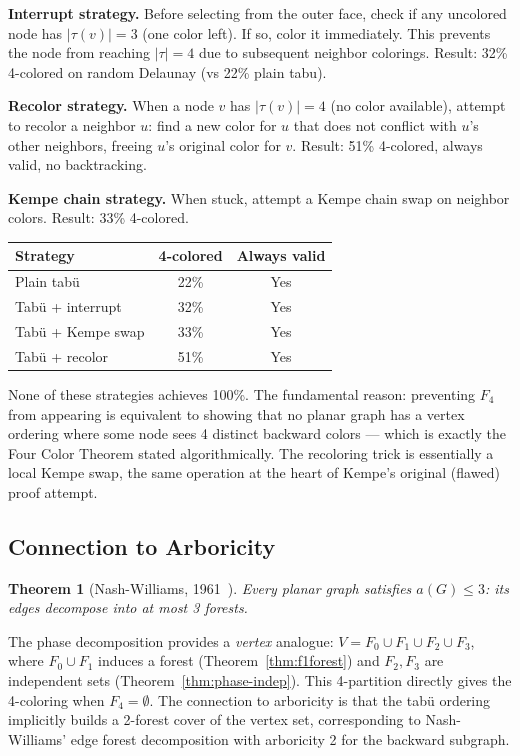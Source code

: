 \documentclass[12pt,letterpaper]{article}
\theoremstyle{plain}
\newtheorem{theorem}{Theorem}[section]
\theoremstyle{definition}
\theoremstyle{remark}
\begin{document}
\textbf{Interrupt strategy.} Before selecting from the outer face, check if any
uncolored node has $|\tau(v)| = 3$ (one color left). If so, color it immediately.
This prevents the node from reaching $|\tau| = 4$ due to subsequent neighbor
colorings. Result: 32\% 4-colored on random Delaunay (vs 22\% plain tabu).

\textbf{Recolor strategy.} When a node $v$ has $|\tau(v)| = 4$ (no color
available), attempt to recolor a neighbor $u$: find a new color for $u$ that
does not conflict with $u$'s other neighbors, freeing $u$'s original color for
$v$. Result: 51\% 4-colored, always valid, no backtracking.

\textbf{Kempe chain strategy.} When stuck, attempt a Kempe chain swap on
neighbor colors. Result: 33\% 4-colored.

\begin{center}
\begin{tabular}{lcc}
\toprule
\textbf{Strategy} & \textbf{4-colored} & \textbf{Always valid} \\
\midrule
Plain tab\"{u}             & 22\% & Yes \\
Tab\"{u} + interrupt       & 32\% & Yes \\
Tab\"{u} + Kempe swap      & 33\% & Yes \\
Tab\"{u} + recolor         & 51\% & Yes \\
\bottomrule
\end{tabular}
\end{center}

None of these strategies achieves 100\%. The fundamental reason: preventing
$F_4$ from appearing is equivalent to showing that no planar graph has a vertex
ordering where some node sees 4 distinct backward colors — which is exactly the
Four Color Theorem stated algorithmically. The recoloring trick is essentially
a local Kempe swap, the same operation at the heart of Kempe's original (flawed)
proof attempt.

\subsection{Connection to Arboricity}

\begin{theorem}[Nash-Williams, 1961~\cite{nashwilliams1961}]
Every planar graph satisfies $a(G) \leq 3$: its edges decompose into at most 3
forests.
\end{theorem}

The phase decomposition provides a \emph{vertex} analogue: $V = F_0 \cup F_1
\cup F_2 \cup F_3$, where $F_0 \cup F_1$ induces a forest (Theorem~\ref{thm:f1forest})
and $F_2, F_3$ are independent sets (Theorem~\ref{thm:phase-indep}). This
4-partition directly gives the 4-coloring when $F_4 = \emptyset$. The
connection to arboricity is that the tab\"{u} ordering implicitly builds a
2-forest cover of the vertex set, corresponding to Nash-Williams' edge forest
decomposition with arboricity 2 for the backward subgraph.
\end{document}
